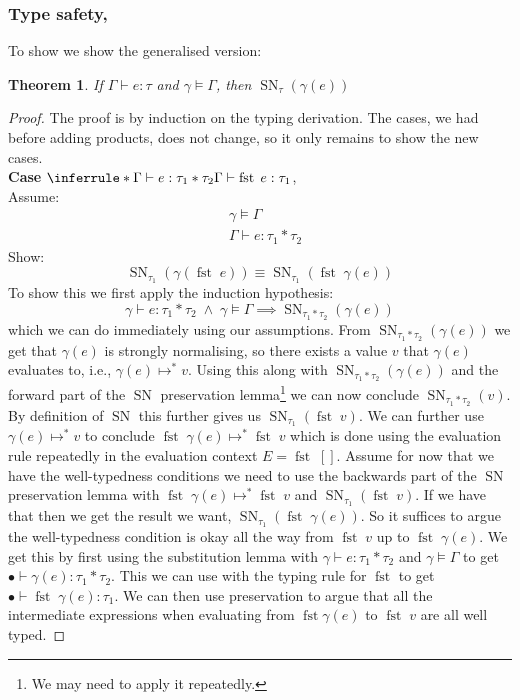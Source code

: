 \documentclass[a4paper,10pt,fleqn]{article}
\DeclareMathOperator{\SNPred}{SN}
\DeclareMathOperator{\fst}{fst}
\newcommand{\evalto}{\ensuremath{\mapsto}}
\newcommand{\evaltos}[1][*]{\ensuremath{\evalto^{#1}}}
\newcommand{\mtenv}{\ensuremath{\bullet}}
\newcommand{\case}[1]{~\\{\bf Case} #1,~\\}
\newcommand{\SN}[2]{\ensuremath{\SNPred_{#1}(#2)}}
\newcommand{\pand}{\ensuremath{\; \wedge \;}}
\newcommand*{\circled}[1]{\tikz[baseline=(char.base)]{
            \node[shape=circle,draw,inner sep=2pt] (char) {#1};}}
\newcommand{\TFst}{\ensuremath{
    \inferrule*{\Gamma \vdash e : \tau_1 * \tau_2}
               {\Gamma \vdash \fst \; e : \tau_1}}}
\newtheorem*{theorem}{Theorem}
\begin{document}
\subsubsection*{Type safety, \circled{a}}
To show \circled{a} we show the generalised version:
\begin{theorem}
  If $\Gamma \vdash e : \tau$ and $\gamma \models \Gamma$, then $\SN{\tau}{\gamma(e)}$
\end{theorem}
\begin{proof}
  The proof is by induction on the typing derivation. The cases, we had before adding products, does not change, so it only remains to show the new cases.
  \case{\TFst}
  Assume:
  \begin{align*}
    & \gamma \models \Gamma \\
    & \Gamma \vdash e : \tau_1 * \tau_2
  \end{align*}
  Show:
  \[
  \SN{\tau_1}{\gamma(\fst \; e)} \equiv \SN{\tau_1}{\fst \; \gamma(e)}
  \]
  To show this we first apply the induction hypothesis:
  \[
    \gamma \vdash e : \tau_1 * \tau_2 \pand \gamma \models \Gamma \implies \SN{\tau_1*\tau_2}{\gamma(e)}
  \]
  which we can do immediately using our assumptions. From $\SN{\tau_1*\tau_2}{\gamma(e)}$ we get that $\gamma(e)$ is strongly normalising, so there exists a value $v$ that $\gamma(e)$ evaluates to, i.e., $\gamma(e) \evaltos v$. Using this along with $\SN{\tau_1*\tau_2}{\gamma(e)}$ and the forward part of the $\SNPred$ preservation lemma\footnote{We may need to apply it repeatedly.} we can now conclude $\SN{\tau_1*\tau_2}{v}$. By definition of $\SNPred$ this further gives us $\SN{\tau_1}{\fst \; v}$. We can further use $\gamma(e) \evaltos v$ to conclude $\fst \; \gamma(e) \evaltos \fst \; v$ which is done using the evaluation rule repeatedly in the evaluation context $E=\fst \; []$. Assume for now that we have the well-typedness conditions we need to use the backwards part of the $\SNPred$ preservation lemma with $\fst \; \gamma(e) \evaltos \fst \; v$ and $\SN{\tau_1}{\fst \; v}$. If we have that then we get the result we want, $\SN{\tau_1}{\fst \; \gamma(e)}$. So it suffices to argue the well-typedness condition is okay all the way from $\fst \; v$ up to $\fst \; \gamma(e)$. We get this by first using the substitution lemma with $\gamma \vdash e : \tau_1 * \tau_2$ and $\gamma \models \Gamma$ to get $\mtenv \vdash \gamma(e) : \tau_1 * \tau_2$. This we can use with the typing rule for $\fst$ to get $\mtenv \vdash \fst \; \gamma(e) : \tau_1$. We can then use preservation to argue that all the intermediate expressions when evaluating from $\fst \gamma(e)$ to $\fst \; v$ are all well typed.

\end{proof}
\end{document}
